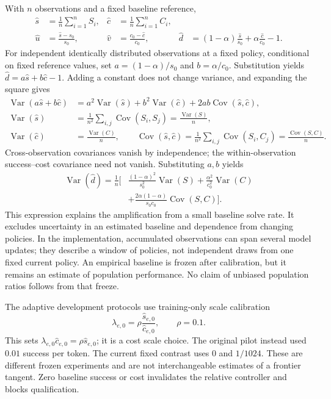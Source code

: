\documentclass[11pt]{article}
\newcommand{\Var}{\operatorname{Var}}
\newcommand{\Cov}{\operatorname{Cov}}
\begin{document}
With $n$ observations and a fixed baseline reference,
\begin{align}
 \widehat s&=\frac1n\sum_{i=1}^nS_i,& \widehat c&=\frac1n\sum_{i=1}^nC_i,\\
 \widehat u&=\frac{\widehat s-s_0}{s_0},&
 \widehat v&=\frac{c_0-\widehat c}{c_0},&
 \widehat d&=(1-\alpha)\frac{\widehat s}{s_0}
                 +\alpha\frac{\widehat c}{c_0}-1.\label{eq:feedbacknoise}
\end{align}
For independent identically distributed observations at a fixed policy, conditional on fixed reference values,
set $a=(1-\alpha)/s_0$ and $b=\alpha/c_0$. Substitution yields $\widehat d=a\widehat s+b\widehat c-1$. Adding a constant does not change variance, and expanding the square gives
\begin{align}
 \Var(a\widehat s+b\widehat c)
 &=a^2\Var(\widehat s)+b^2\Var(\widehat c)
                         +2ab\Cov(\widehat s,\widehat c),\\
 \Var(\widehat s)&=\frac1{n^2}\sum_{i,j}\Cov(S_i,S_j)
                  =\frac{\Var(S)}n,\\
 \Var(\widehat c)&=\frac{\Var(C)}n,\qquad
 \Cov(\widehat s,\widehat c)=\frac1{n^2}\sum_{i,j}\Cov(S_i,C_j)
                            =\frac{\Cov(S,C)}n.
\end{align}
Cross-observation covariances vanish by independence; the within-observation success--cost covariance need not vanish. Substituting $a,b$ yields
\begin{equation}
 \begin{aligned}
 \Var(\widehat d)=\frac1n\bigg[&\frac{(1-\alpha)^2}{s_0^2}\Var(S)
 +\frac{\alpha^2}{c_0^2}\Var(C)\\
 &+\frac{2\alpha(1-\alpha)}{s_0c_0}\Cov(S,C)\bigg].
 \end{aligned}\label{eq:noisevariance}
\end{equation}
This expression explains the amplification from a small baseline solve rate. It excludes uncertainty in an estimated baseline and dependence from changing policies. In the implementation, accumulated observations can span several model updates; they describe a window of policies, not independent draws from one fixed current policy. An empirical baseline is frozen after calibration, but it remains an estimate of population performance. No claim of unbiased population ratios follows from that freeze.

The adaptive development protocols use training-only scale calibration
\begin{equation}
 \lambda_{e,0}=\rho\frac{\widehat s_{e,0}}{\widehat c_{e,0}},\qquad \rho=0.1.
 \label{eq:calibration}
\end{equation}
This sets $\lambda_{e,0}\widehat c_{e,0}=\rho\widehat s_{e,0}$; it is a cost scale choice. The original pilot instead used $0.01$ success per token. The current fixed contrast uses $0$ and $1/1024$. These are different frozen experiments and are not interchangeable estimates of a frontier tangent. Zero baseline success or cost invalidates the relative controller and blocks qualification.
\end{document}
